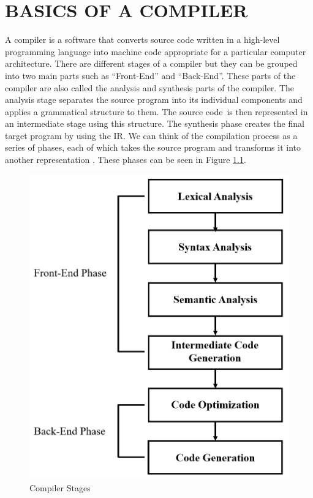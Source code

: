 \clearpage
\chapter{BASICS OF A COMPILER}\label{Ch2}
A compiler is a software that converts source code written in a high-level programming language into machine code appropriate for a particular computer architecture.
There are different stages of a compiler but they can be grouped into two main parts such as “Front-End” and “Back-End”. %
These parts of the compiler are also called the analysis and synthesis parts of the compiler. The analysis stage separates the source program into its individual components and applies a grammatical structure to them. The source code is then represented in an intermediate stage using this structure. The synthesis phase creates the final target program by using the IR. We can think of the compilation process as a series of phases, each of which takes the source program and transforms it into another representation \cite{compileralfredaho}. These phases can be seen in Figure \ref{fig:comp_stages}.
\begin{figure}
    \centering
    \includegraphics[scale=0.25]{basics_of_compiler/comp_stages.jpeg}
    \caption{Compiler Stages}
    \label{fig:comp_stages}
\end{figure}


